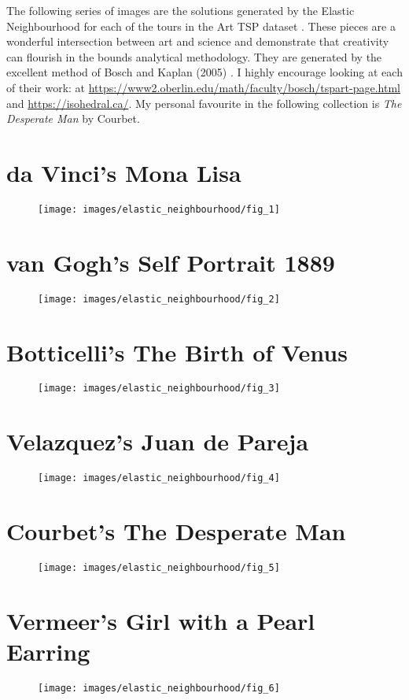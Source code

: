 

The following series of images are the solutions generated by the Elastic Neighbourhood for each of the tours in the Art TSP dataset \cite{ArtTSP}. These pieces are a wonderful intersection between art and science and demonstrate that creativity can flourish in the bounds analytical methodology. They are generated by the excellent method of Bosch and Kaplan (2005) \cite{bridges2005301}. I highly encourage looking at each of their work: at \href{https://www2.oberlin.edu/math/faculty/bosch/tspart-page.html}{https://www2.oberlin.edu/math/faculty/bosch/tspart-page.html} and \href{https://isohedral.ca/}{https://isohedral.ca/}. My personal favourite in the following collection is \textit{The Desperate Man} by Courbet.
\newpage
\section*{da Vinci's Mona Lisa}
\begin{figure}[h!]
	\centering
	\texttt{[image: images/elastic\_neighbourhood/fig\_1]}
\end{figure}
\newpage
\section*{van Gogh's Self Portrait 1889}
\begin{figure}[h!]
	\centering
	\texttt{[image: images/elastic\_neighbourhood/fig\_2]}
\end{figure}
\newpage
\section*{Botticelli's The Birth of Venus}
\begin{figure}[h!]
	\centering
	\texttt{[image: images/elastic\_neighbourhood/fig\_3]}
\end{figure}
\newpage
\section*{Velazquez's Juan de Pareja}
\begin{figure}[h!]
	\centering
	\texttt{[image: images/elastic\_neighbourhood/fig\_4]}
\end{figure}
\newpage
\section*{Courbet's The Desperate Man}
\begin{figure}[h!]
	\centering
	\texttt{[image: images/elastic\_neighbourhood/fig\_5]}
\end{figure}
\newpage
\section*{Vermeer's Girl with a Pearl Earring}
\begin{figure}[h!]
	\centering
	\texttt{[image: images/elastic\_neighbourhood/fig\_6]}
\end{figure}